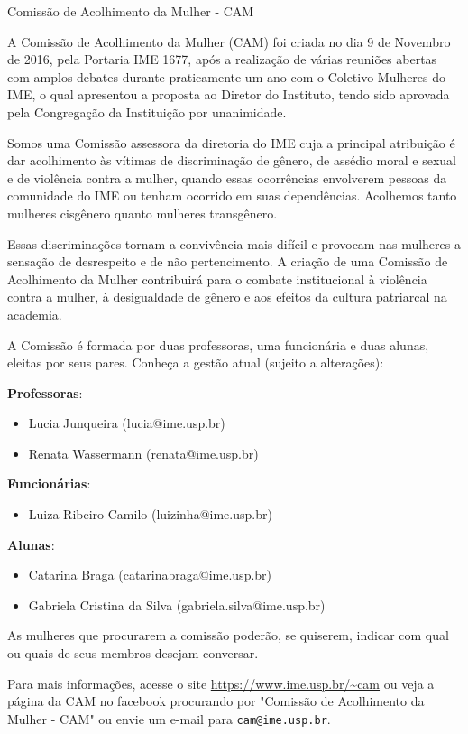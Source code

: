 \begin{subsecao}{Comissão de Acolhimento da Mulher - CAM}

A Comissão de Acolhimento da Mulher (CAM) foi criada no dia 9 de Novembro de 2016,
pela Portaria IME 1677, após a realização de várias reuniões abertas com amplos
debates durante praticamente um ano com o Coletivo Mulheres do IME, o qual 
apresentou a proposta ao Diretor do Instituto, tendo sido aprovada pela Congregação
da Instituição por unanimidade.

Somos uma Comissão assessora da diretoria do IME cuja a principal atribuição 
é dar acolhimento às vítimas de discriminação de gênero, de assédio moral e 
sexual e de violência contra a mulher, quando essas ocorrências envolverem 
pessoas da comunidade do IME ou tenham ocorrido em suas dependências. Acolhemos
tanto mulheres cisgênero quanto mulheres transgênero.

Essas discriminações tornam a convivência mais difícil e provocam nas mulheres
a sensação de desrespeito e de não pertencimento. A criação de uma Comissão de 
Acolhimento da Mulher contribuirá para o combate institucional à violência contra
a mulher, à desigualdade de gênero e aos efeitos da cultura patriarcal na academia.

A Comissão é formada por duas professoras, uma funcionária e duas alunas, 
eleitas por seus pares. Conheça a gestão atual (sujeito a alterações): 

\textbf{Professoras}: 
\begin{itemize}
  \item Lucia Junqueira (lucia@ime.usp.br)
  \item Renata Wassermann (renata@ime.usp.br)
\end{itemize}

\textbf{Funcionárias}: 
\begin{itemize}
  \item Luiza Ribeiro Camilo (luizinha@ime.usp.br)
\end{itemize}

\textbf{Alunas}: 
\begin{itemize}
  \item Catarina Braga (catarinabraga@ime.usp.br)
  \item Gabriela Cristina da Silva (gabriela.silva@ime.usp.br)
\end{itemize}

As mulheres que procurarem a comissão poderão, se quiserem, indicar com qual ou 
quais de seus membros desejam conversar.

Para mais informações, acesse o site \url{https://www.ime.usp.br/~cam} ou veja
a página da CAM no facebook procurando por "Comissão de Acolhimento da Mulher - CAM" 
 ou envie um e-mail para {\tt cam@ime.usp.br}. 


\end{subsecao}
